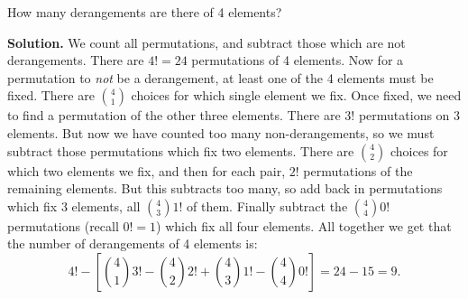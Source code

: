 \documentclass{book}
\begin{document}
\setcounter{project}{228}
\addtocounter{project}{-1}
\begin{activity}[]\label{activity-221}
\hypertarget{p-1273}{}%
How many derangements are there of 4 elements?%
\par\smallskip%
\noindent\textbf{Solution.}\hypertarget{solution-155}{}\quad%
\hypertarget{p-1274}{}%
We count all permutations, and subtract those which are not derangements. There are \(4! = 24\) permutations of 4 elements. Now for a permutation to \emph{not} be a derangement, at least one of the 4 elements must be fixed. There are \({4 \choose 1}\) choices for which single element we fix. Once fixed, we need to find a permutation of the other three elements. There are \(3!\) permutations on 3 elements. But now we have counted too many non-derangements, so we must subtract those permutations which fix two elements. There are \({4 \choose 2}\) choices for which two elements we fix, and then for each pair, \(2!\) permutations of the remaining elements. But this subtracts too many, so add back in permutations which fix 3 elements, all \({4 \choose 3}1!\) of them. Finally subtract the \({4 \choose 4}0!\) permutations (recall \(0! = 1\)) which fix all four elements. All together we get that the number of derangements of 4 elements is:%
\begin{equation*}
4! - \left[{4 \choose 1}3! - {4 \choose 2}2! + {4 \choose 3} 1! - {4 \choose 4}0!\right] = 24 - 15 = 9.
\end{equation*}
%
\end{activity}
\end{document}
